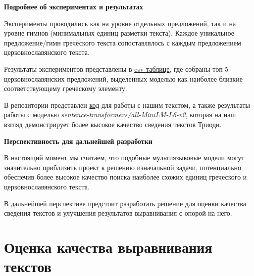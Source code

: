 \documentclass[
  letterpaper,
]{book}
\begin{document}
\begin{tcolorbox}[enhanced jigsaw, colframe=quarto-callout-note-color-frame, rightrule=.15mm, breakable, arc=.35mm, left=2mm, colback=white, bottomrule=.15mm, toprule=.15mm, leftrule=.75mm, opacityback=0]

\textbf{Подробнее об экспериментах и результатах}\vspace{2mm}

Эксперименты проводились как на уровне отдельных предложений, так и на
уровне гимнов (минимальных единиц разметки текста). Каждое уникальное
предложение/гимн греческого текста сопоставлялось с каждым предложением
церковнославянского текста.

Результаты экспериментов представлены в
\href{https://github.com/Drozhzhinastya/GSPC/tree/main/csv/sbert}{csv
таблице}, где собраны топ-5 церковнославянских предложений, выделенных
моделью как наиболее близкие соответствующему греческому элементу.

\end{tcolorbox}

В репозитории представлен
\href{https://github.com/Drozhzhinastya/GSPC/blob/main/scripts/text-similarity/GSPC_sbert.ipynb}{код}
для работы с нашим текстом, а также результаты работы с моделью
\emph{sentence-transformers/all-MiniLM-L6-v2}, которая на наш взгляд
демонстрирует более высокое качество сведения текстов Триоди.

\begin{tcolorbox}[enhanced jigsaw, colframe=quarto-callout-tip-color-frame, rightrule=.15mm, breakable, arc=.35mm, left=2mm, colback=white, bottomrule=.15mm, toprule=.15mm, leftrule=.75mm, opacityback=0]

\textbf{Перспективность для дальнейшей разработки}\vspace{2mm}

В настоящий момент мы считаем, что подобные мультиязыковые модели могут
значительно приблизить проект к решению изначальной задачи, потенциально
обеспечив более высокое качество поиска наиболее схожих единиц
греческого и церковнославянского текста.

В дальнейшей перспективе предстоит разработать решение для оценки
качества сведения текстов и улучшения результатов выравнивания с опорой
на него.

\end{tcolorbox}


\hypertarget{sec-about_evluation}{%
\chapter{Оценка качества выравнивания
текстов}\label{sec-about_evluation}}
\end{document}
